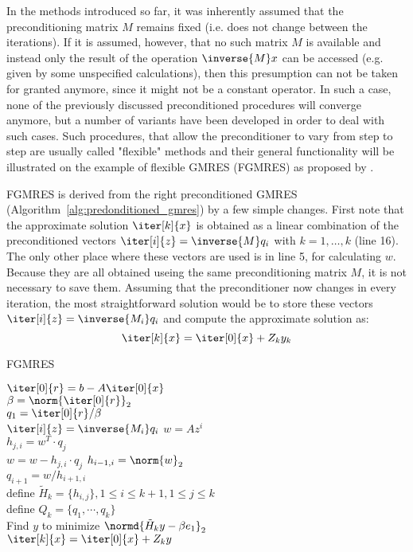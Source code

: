 In the methods introduced so far, it was inherently assumed that the preconditioning matrix $M$ remains fixed (i.e. does not change between the iterations). If it is assumed, however, that no such matrix $M$ is available and instead only the result of the operation $\inverse{M}x$ can be accessed (e.g. given by some unspecified calculations), then this presumption can not be taken for granted anymore, since it might not be a constant operator. In such a case, none of the previously discussed preconditioned procedures will converge anymore, but a number of variants have been developed in order to deal with such cases. Such procedures, that allow the preconditioner to vary from step to step are usually called "flexible" methods and their general functionality will be illustrated on the example of flexible GMRES (FGMRES) as proposed by \cite{saad_flexible_1993}.

FGMRES is derived from the right preconditioned GMRES (Algorithm~\hyperref[alg:predonditioned_gmres]{\ref{alg:predonditioned_gmres}}) by a few simple changes. First note that the approximate solution $\iter[k]{x}$ is obtained as a linear combination of the preconditioned vectors $\iter[i]{z}=\inverse{M}q_i$ with $k=1,\dots, k$ (line 16). The only other place where these vectors are used is in line 5, for calculating $w$. Because they are all obtained useing the same preconditioning matrix $M$, it is not necessary to save them. Assuming that the preconditioner now changes in every iteration, the most straightforward solution would be to store these vectors $\iter[i]{z}=\inverse{M_i}q_i$ and compute the approximate solution as:
\begin{equation}
    \iter[k]{x}= \iter[0]{x}+Z_ky_k
\end{equation}

\begin{algorithm}[h]
  \caption{FGMRES}
  \label{alg:fgmres}
  \SetAlgoLined
  \DontPrintSemicolon
  $\iter[0]{r} = b-A\iter[0]{x}$ \\
  $\beta = \norm{\iter[0]{r}}_2$ \\
  $q_1 = \iter[0]{r}/\beta$ \\
   {
    $\iter[i]{z} = \inverse{M_i}q_i$
    $w =A z^i$ \\
     {
      $h_{j,i} = w^T\cdot q_j$ \\
      $ w = w - h_{j,i}\cdot q_j$}
    $h_{i-1,i} = \norm{w}_2$ \\
    $q_{i+1} = w/h_{i+1,i}$ \\
  }
  define $\tilde{H}_k = \{h_{i,j}\}, 1 \leq i \leq k+1, 1 \leq j \leq k$ \\
  define $Q_k = \{q_1, \cdots, q_k\}$ \\
  Find $y$ to minimize $\normd{\tilde{H}_ky-\beta e_1}_2$ \\
  $\iter[k]{x} = \iter[0]{x} + Z_ky$
\end{algorithm}

